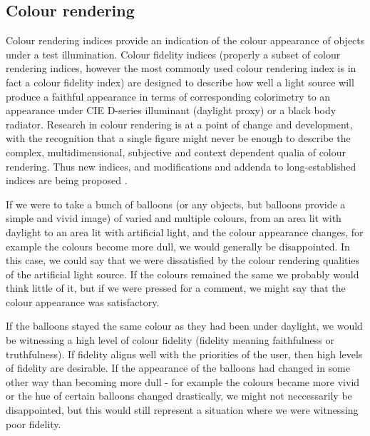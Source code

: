 \subsection{Colour rendering}

Colour rendering indices provide an indication of the colour appearance of objects under a test illumination. Colour fidelity indices (properly a subset of colour rendering indices, however the most commonly used colour rendering index is in fact a colour fidelity index) are designed to describe how well a light source will produce a faithful appearance in terms of corresponding colorimetry to an appearance under \gls{CIE} D-series illuminant (daylight proxy) or a black body radiator. %
Research in colour rendering is at a point of change and development, with the recognition that a single figure might never be enough to describe the complex, multidimensional, subjective and context dependent qualia of colour rendering\citep{rea_color_2008}. Thus new indices, and modifications and addenda to long-established indices are being proposed \citep{smet_memory_2012,davis_color_2010,rea_practical_2010,ies_ies_2015,teunissen_characterising_2016}.

If we were to take a bunch of balloons (or any objects, but balloons provide a simple and vivid image) of varied and multiple colours, from an area lit with daylight to an area lit with artificial light, and the colour appearance changes, for example the colours become more dull, we would generally be disappointed. In this case, we could say that we were dissatisfied by the colour rendering qualities of the artificial light source. If the colours remained the same we probably would think little of it, but if we were pressed for a comment, we might say that the colour appearance was satisfactory. 

If the balloons stayed the same colour as they had been under daylight, we would be witnessing a high level of colour fidelity (fidelity meaning faithfulness or truthfulness). If fidelity aligns well with the priorities of the user, then high levels of fidelity are desirable. If the appearance of the balloons had changed in some other way than becoming more dull - for example the colours became more vivid or the hue of certain balloons changed drastically, we might not neccessarily be disappointed, but this would still represent a situation where we were witnessing poor fidelity.

